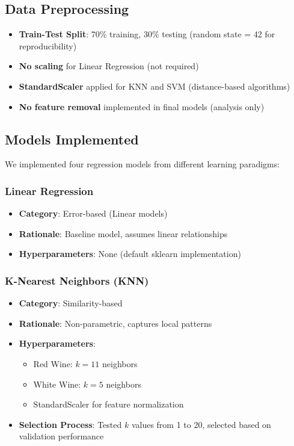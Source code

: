 \documentclass[12pt]{article}
\begin{document}
\subsection{Data Preprocessing}
\begin{itemize}
    \item \textbf{Train-Test Split}: 70\% training, 30\% testing (random state = 42 for reproducibility)
    \item \textbf{No scaling} for Linear Regression (not required)
    \item \textbf{StandardScaler} applied for KNN and SVM (distance-based algorithms)
    \item \textbf{No feature removal} implemented in final models (analysis only)
\end{itemize}

\subsection{Models Implemented}
We implemented four regression models from different learning paradigms:

\subsubsection{Linear Regression}
\begin{itemize}
    \item \textbf{Category}: Error-based (Linear models)
    \item \textbf{Rationale}: Baseline model, assumes linear relationships
    \item \textbf{Hyperparameters}: None (default sklearn implementation)
\end{itemize}

\subsubsection{K-Nearest Neighbors (KNN)}
\begin{itemize}
    \item \textbf{Category}: Similarity-based
    \item \textbf{Rationale}: Non-parametric, captures local patterns
    \item \textbf{Hyperparameters}: 
    \begin{itemize}
        \item Red Wine: $k = 11$ neighbors
        \item White Wine: $k = 5$ neighbors
        \item StandardScaler for feature normalization
    \end{itemize}
    \item \textbf{Selection Process}: Tested $k$ values from 1 to 20, selected based on validation performance
\end{itemize}
\end{document}
